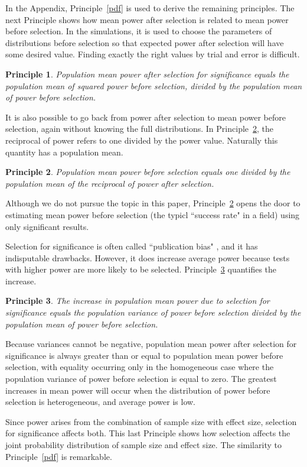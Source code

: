 \documentclass[jou]{apa6} %
\newtheorem{princ}{Principle}
\begin{document}
In the Appendix, Principle~\ref{pdf} is used to derive the remaining principles. The next Principle shows how mean power after selection is related to mean power before selection. In the simulations, it is used to choose the parameters of distributions before selection so that expected power after selection will have some desired value. 
Finding exactly the right values by trial and error is difficult.
\begin{princ} \label{meansquaredovermean}
Population mean power after selection for significance equals the population mean of squared power before selection, divided by the population mean of power before selection.  
\end{princ}
It is also possible to go back from power after selection to mean power before selection, again without knowing the full distributions. In Principle~\ref{recip}, the reciprocal of power refers to one divided by the power value. Naturally this quantity has a population mean.
\begin{princ} \label{recip}
Population mean power before selection equals one divided by the population mean of the reciprocal of power after selection.
\end{princ}
Although we do not pursue the topic in this paper, Principle~\ref{recip} opens the door to estimating mean power before selection (the typicl ``success rate" in a field) using only significant results.

Selection for significance is often called ``publication bias" \parencite{Sterling1959, SterlingEtAl1995}, and it has indisputable drawbacks. However, it does increase average power because tests with higher power are more likely to be selected. Principle~\ref{increase} quantifies the increase.
\begin{princ} \label{increase}
The increase in population mean power due to selection for significance equals the population variance of power before selection divided by the population mean of power before selection.
\end{princ}
Because variances cannot be negative, population mean power after selection for significance is always greater than or equal to population mean power before selection, with equality occurring only in the homogeneous case where the population variance of power before selection is equal to zero. The greatest increases in mean power will occur when the distribution of power before selection is heterogeneous, and average power is low.

Since power arises from the combination of sample size with effect size, selection for significance affects both. This last Principle shows how selection affects the joint probability distribution of sample size and effect size. The similarity to Principle~\ref{pdf} is remarkable.
\end{document}
